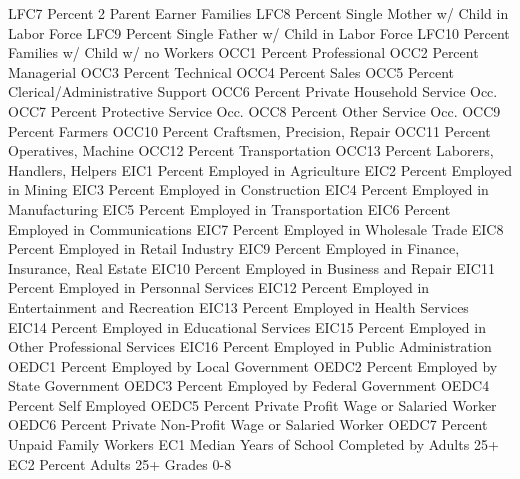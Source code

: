\documentclass[
  11pt,
  a4paper,
  DIV=12,captions=tableheading,oneside,titlepage]{scrbook}
\let\oldverbatim\verbatim
\let\endoldverbatim\endverbatim
\renewenvironment{verbatim}{\footnotesize\oldverbatim}{\endoldverbatim}
\begin{document}
\begin{verbatim}
LFC7                        Percent 2 Parent Earner Families
LFC8                        Percent Single Mother w/ Child in Labor Force
LFC9                        Percent Single Father w/ Child in Labor Force
LFC10                       Percent Families w/ Child w/ no Workers
OCC1                        Percent Professional
OCC2                        Percent Managerial
OCC3                        Percent Technical
OCC4                        Percent Sales
OCC5                        Percent Clerical/Administrative Support
OCC6                        Percent Private Household Service Occ.
OCC7                        Percent Protective Service Occ.
OCC8                        Percent Other Service Occ.
OCC9                        Percent Farmers
OCC10                       Percent Craftsmen, Precision, Repair
OCC11                       Percent Operatives, Machine
OCC12                       Percent Transportation
OCC13                       Percent Laborers, Handlers, Helpers
EIC1                        Percent Employed in Agriculture
EIC2                        Percent Employed in Mining
EIC3                        Percent Employed in Construction
EIC4                        Percent Employed in Manufacturing
EIC5                        Percent Employed in Transportation
EIC6                        Percent Employed in Communications
EIC7                        Percent Employed in Wholesale Trade
EIC8                        Percent Employed in Retail Industry
EIC9                        Percent Employed in Finance, Insurance, Real Estate
EIC10                       Percent Employed in Business and Repair
EIC11                       Percent Employed in Personnal Services
EIC12                       Percent Employed in Entertainment and Recreation
EIC13                       Percent Employed in Health Services
EIC14                       Percent Employed in Educational Services
EIC15                       Percent Employed in Other Professional Services
EIC16                       Percent Employed in Public Administration
OEDC1                       Percent Employed by Local Government
OEDC2                       Percent Employed by State Government
OEDC3                       Percent Employed by Federal Government
OEDC4                       Percent Self Employed
OEDC5                       Percent Private Profit Wage or Salaried Worker
OEDC6                       Percent Private Non-Profit Wage or Salaried Worker
OEDC7                       Percent Unpaid Family Workers
EC1                         Median Years of School Completed by Adults 25+
EC2                         Percent Adults 25+ Grades 0-8

\end{verbatim}
\end{document}
